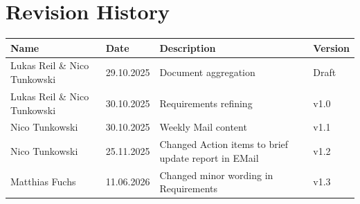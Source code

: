 


\chapter*{Revision History}

\begin{center}
	\begin{tabular}{ |p{4cm}|p{2.5cm}|p{5cm}|p{2cm}| } 
		\hline
		\rowcolor{black!3}
		 Name & Date & Description & Version \\ 
		\hline
		Lukas Reil \& Nico Tunkowski & 29.10.2025 & Document aggregation & Draft \\
        \hline
        Lukas Reil \& Nico Tunkowski & 30.10.2025 & Requirements refining & v1.0 \\
        \hline
        Nico Tunkowski & 30.10.2025 & Weekly Mail content & v1.1 \\ 
        \hline
        Nico Tunkowski & 25.11.2025 & Changed Action items to brief update report in EMail & v1.2 \\
        \hline
        Matthias Fuchs & 11.06.2026 & Changed minor wording in Requirements & v1.3 \\
        \hline
	\end{tabular}
\end{center}

